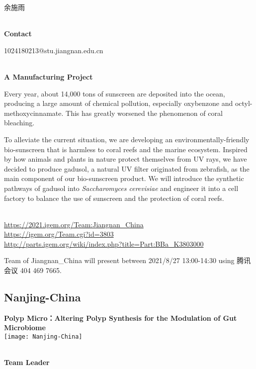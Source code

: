   余施雨


\textbf{\\Contact}

  1024180213@stu.jiangnan.edu.cn


\textbf{\\A Manufacturing Project\\}\begin{spacing}{1.5}

Every year, about 14,000 tons of sunscreen are deposited into the ocean, producing a large amount of chemical pollution, especially oxybenzone and octyl-methoxycinnamate. This has greatly worsened the phenomenon of coral bleaching.

To alleviate the current situation, we are developing an environmentally-friendly bio-sunscreen that is harmless to coral reefs and the marine ecosystem. Inspired by how animals and plants in nature protect themselves from UV rays, we have decided to produce gadusol, a natural UV filter originated from zebrafish, as the main component of our bio-sunscreen product. We will introduce the synthetic pathways of gadusol into \textit{Saccharomyces cerevisiae} and engineer it into a cell factory to balance the use of sunscreen and the protection of coral reefs.\end{spacing}
\\

\url{https://2021.igem.org/Team:Jiangnan\_China }\\
\url{https://igem.org/Team.cgi?id=3803 }\\
\url{http://parts.igem.org/wiki/index.php?title=Part:BBa_K3803000 }\\


\vfill{}









Team of Jiangnan\_China will present between 2021/8/27 13:00-14:30        using 腾讯会议 404 469 7665.
\newpage


\subsection{\textcolor{Blu}{ Nanjing-China } }
\vspace{5mm}
\begin{center}
\large{
  \textbf{ Polyp Micro：Altering Polyp Synthesis for the Modulation of Gut Microbiome }\\

  \texttt{[image: Nanjing-China]}
}
\end{center}
\textbf{\\Team Leader}

